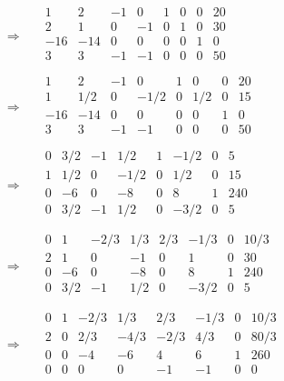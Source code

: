 \documentclass[dvipdfmx,titlepage, a4paper]{jsarticle}%
\begin{document}
\begin{eqnarray*}
	\Longrightarrow
	&&\begin{array}{cccccccc}
		1 & 2 & -1 & 0 & 1 & 0 & 0 &20\\ 
		2 & 1 & 0 & -1 & 0 & 1 & 0 & 30\\ 
		-16 & -14 & 0 & 0 & 0 & 0 & 1 & 0\\ 
		3 & 3 & -1 & -1 & 0 & 0 & 0 & 50\\ 
	\end{array}\\
	\Longrightarrow
	&&\begin{array}{cccccccc}
		1 & 2 & -1 & 0 & 1 & 0 & 0 &20\\ 
		1 & 1/2 & 0 & -1/2 & 0 & 1/2 & 0 & 15\\ 
		-16 & -14 & 0 & 0 & 0 & 0 & 1 & 0\\ 
		3 & 3 & -1 & -1 & 0 & 0 & 0 & 50\\ 
	\end{array}\\
	\Longrightarrow
	&&\begin{array}{cccccccc}
		0 & 3/2 & -1 & 1/2 & 1 & -1/2 & 0 &5\\ 
		1 & 1/2 & 0 & -1/2 & 0 & 1/2 & 0 & 15\\ 
		0 & -6 & 0 & -8 & 0 & 8 & 1 & 240\\ 
		0 & 3/2 & -1 & 1/2 & 0 & -3/2 & 0 & 5\\ 
	\end{array}\\
	\Longrightarrow
	&&\begin{array}{cccccccc}
		0 & 1 & -2/3 & 1/3 & 2/3 & -1/3 & 0 & 10/3\\ 
		2 & 1 & 0 & -1 & 0 & 1 & 0 & 30\\ 
		0 & -6 & 0 & -8 & 0 & 8 & 1 & 240\\ 
		0 & 3/2 & -1 & 1/2 & 0 & -3/2 & 0 & 5\\ 
	\end{array}\\
	\Longrightarrow
	&&\begin{array}{cccccccc}
		0 & 1 & -2/3 & 1/3 & 2/3 & -1/3 & 0 & 10/3\\ 
		2 & 0 & 2/3 & -4/3 & -2/3 & 4/3 & 0 & 80/3\\ 
		0 & 0 & -4 & -6 & 4 & 6 & 1 & 260\\ 
		0 & 0 & 0 & 0 & -1 & -1 & 0 & 0\\ 
	\end{array}\\
\end{eqnarray*}
\end{document}
